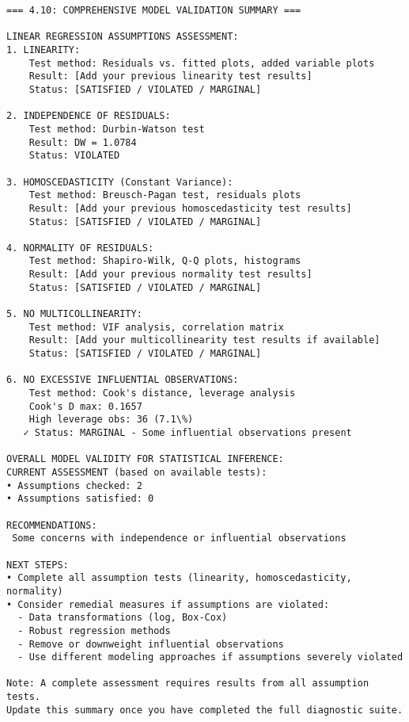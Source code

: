 \documentclass[11pt, twocolumn]{article}
\begin{document}
    \begin{Verbatim}[commandchars=\\\{\}]
=== 4.10: COMPREHENSIVE MODEL VALIDATION SUMMARY ===

LINEAR REGRESSION ASSUMPTIONS ASSESSMENT:
1. LINEARITY:
    Test method: Residuals vs. fitted plots, added variable plots
    Result: [Add your previous linearity test results]
    Status: [SATISFIED / VIOLATED / MARGINAL]

2. INDEPENDENCE OF RESIDUALS:
    Test method: Durbin-Watson test
    Result: DW = 1.0784
    Status: VIOLATED

3. HOMOSCEDASTICITY (Constant Variance):
    Test method: Breusch-Pagan test, residuals plots
    Result: [Add your previous homoscedasticity test results]
    Status: [SATISFIED / VIOLATED / MARGINAL]

4. NORMALITY OF RESIDUALS:
    Test method: Shapiro-Wilk, Q-Q plots, histograms
    Result: [Add your previous normality test results]
    Status: [SATISFIED / VIOLATED / MARGINAL]

5. NO MULTICOLLINEARITY:
    Test method: VIF analysis, correlation matrix
    Result: [Add your multicollinearity test results if available]
    Status: [SATISFIED / VIOLATED / MARGINAL]

6. NO EXCESSIVE INFLUENTIAL OBSERVATIONS:
    Test method: Cook's distance, leverage analysis
    Cook's D max: 0.1657
    High leverage obs: 36 (7.1\%)
   ✓ Status: MARGINAL - Some influential observations present

OVERALL MODEL VALIDITY FOR STATISTICAL INFERENCE:
CURRENT ASSESSMENT (based on available tests):
• Assumptions checked: 2
• Assumptions satisfied: 0

RECOMMENDATIONS:
 Some concerns with independence or influential observations

NEXT STEPS:
• Complete all assumption tests (linearity, homoscedasticity, normality)
• Consider remedial measures if assumptions are violated:
  - Data transformations (log, Box-Cox)
  - Robust regression methods
  - Remove or downweight influential observations
  - Use different modeling approaches if assumptions severely violated

Note: A complete assessment requires results from all assumption tests.
Update this summary once you have completed the full diagnostic suite.
    \end{Verbatim}

    \begin{center}
    \end{center}
    { \hspace*{\fill} \\}
    
\end{document}
